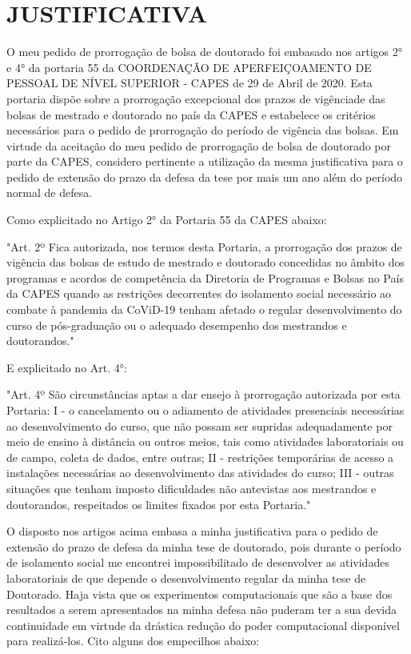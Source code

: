 \chapter{JUSTIFICATIVA}
\label{justificativa}

O meu pedido de prorrogação de bolsa de doutorado foi embasado nos artigos 2° e 4° da portaria 55
da COORDENAÇÃO DE APERFEIÇOAMENTO DE PESSOAL DE NÍVEL SUPERIOR - CAPES de 29 de Abril de 2020.
Esta portaria dispõe sobre a prorrogação excepcional
dos prazos de vigênciade das bolsas de mestrado e doutorado no país da CAPES
e estabelece os critérios necessários para o pedido de prorrogação do período de vigência das bolsas.
Em virtude da aceitação do meu pedido de prorrogação de bolsa de doutorado por parte da CAPES,
considero pertinente a utilização da mesma justificativa para o pedido de extensão do prazo da defesa da tese
por mais um ano além do período normal de defesa.

Como explicitado no Artigo 2° da Portaria 55 da CAPES abaixo:

"Art. 2º Fica autorizada, nos termos desta Portaria, a prorrogação dos prazos de vigência das bolsas de estudo de mestrado e doutorado concedidas no âmbito dos programas e acordos de competência da Diretoria de Programas e Bolsas no País da CAPES quando as restrições decorrentes do isolamento social necessário ao combate à pandemia da CoViD-19 tenham afetado o regular desenvolvimento do curso de pós-graduação ou o adequado desempenho dos mestrandos e doutorandos."

E explicitado no Art. 4°:

"Art. 4º São circunstâncias aptas a dar ensejo à prorrogação autorizada por esta Portaria:
I - o cancelamento ou o adiamento de atividades presenciais necessárias ao desenvolvimento do curso, que não possam ser supridas adequadamente por meio de ensino à distância ou outros meios, tais como atividades laboratoriais ou de campo, coleta de dados, entre outras; II - restrições temporárias de acesso a instalações necessárias ao desenvolvimento das atividades do curso;
III - outras situações que tenham imposto dificuldades não antevistas aos mestrandos e doutorandos, respeitados os limites fixados por esta Portaria."

O disposto nos artigos acima embasa a minha justificativa para o pedido de extensão do prazo de defesa da minha
tese de doutorado, pois durante o período de isolamento social me encontrei impossibilitado de desenvolver as atividades laboratoriais de que depende o desenvolvimento regular da minha tese de Doutorado. Haja vista que os experimentos computacionais que são a base dos resultados a serem apresentados na minha defesa não puderam ter a sua devida continuidade em virtude da drástica redução do poder computacional disponível para realizá-los. Cito alguns dos empecilhos abaixo:

